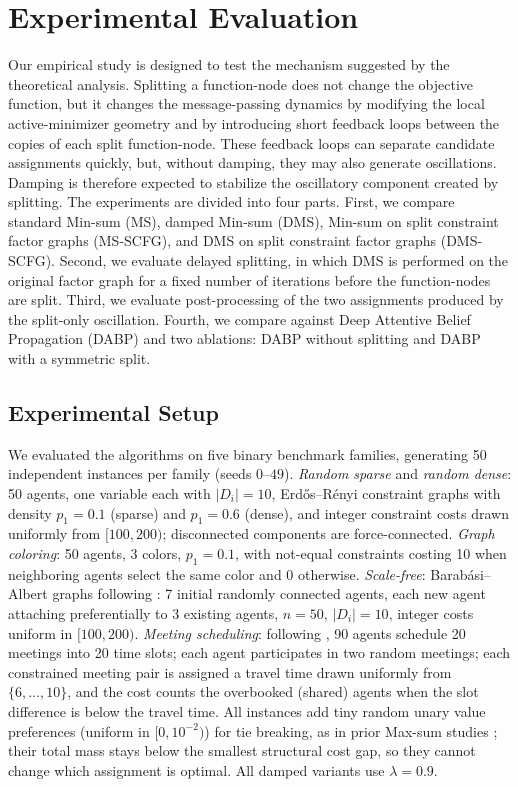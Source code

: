 \documentclass[letterpaper]{article} %
\theoremstyle{definition}
\theoremstyle{remark}
\begin{document}

\section{Experimental Evaluation}
\label{Sec:experiments}
Our empirical study is designed to test the mechanism suggested by the
theoretical analysis.  Splitting a function-node does not change the objective
function, but it changes the message-passing dynamics by modifying the local
active-minimizer geometry and by introducing short feedback loops between the
copies of each split function-node.  These feedback loops can separate
candidate assignments quickly, but, without damping, they may also generate
oscillations.  Damping is therefore expected to stabilize the oscillatory
component created by splitting.
The experiments are divided into four parts.  First, we compare standard
Min-sum (MS), damped Min-sum (DMS), Min-sum on split constraint factor
graphs (MS-SCFG), and DMS on split constraint factor graphs (DMS-SCFG).
Second, we evaluate delayed splitting, in which DMS is performed on the
original factor graph for a fixed number of iterations before the function-nodes
are split.  Third, we evaluate post-processing of the two assignments produced
by the split-only oscillation.  Fourth, we compare against Deep Attentive
Belief Propagation (DABP) and two ablations: DABP without splitting and DABP
with a symmetric split.
\subsection{Experimental Setup}
We evaluated the algorithms on five binary benchmark families, generating 50
independent instances per family (seeds $0$--$49$).
\emph{Random sparse} and \emph{random dense}: 50 agents, one variable each
with $|D_i| = 10$, Erd\H{o}s--R\'enyi constraint graphs with density $p_1 = 0.1$
(sparse) and $p_1 = 0.6$ (dense), and integer constraint costs drawn uniformly
from $[100, 200)$; disconnected components are force-connected.
\emph{Graph coloring}: 50 agents, 3 colors, $p_1 = 0.1$, with not-equal
constraints costing 10 when neighboring agents select the same color and 0
otherwise.
\emph{Scale-free}: Barab\'asi--Albert graphs following \citet{CohenGZ20}: 7
initial randomly connected agents, each new agent attaching preferentially to 3
existing agents, $n = 50$, $|D_i| = 10$, integer costs uniform in $[100, 200)$.
\emph{Meeting scheduling}: following \citet{CohenGZ20}, 90 agents schedule 20
meetings into 20 time slots; each agent participates in two random meetings;
each constrained meeting pair is assigned a travel time drawn uniformly from
$\{6, \ldots, 10\}$, and the cost counts the overbooked (shared) agents when
the slot difference is below the travel time.
All instances add tiny random unary value preferences (uniform in
$[0, 10^{-2})$) for tie breaking, as in prior Max-sum studies
\cite{FarinelliRPJ08}; their total mass stays below the smallest structural
cost gap, so they cannot change which assignment is optimal.
All damped variants use $\lambda = 0.9$.
\end{document}
